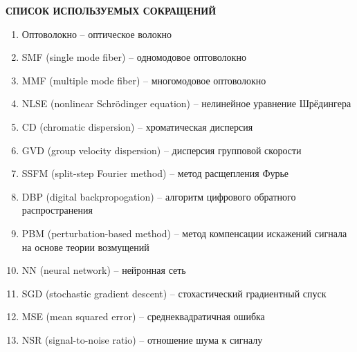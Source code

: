 \newpage
\begin{center}
	\textbf{СПИСОК ИСПОЛЬЗУЕМЫХ СОКРАЩЕНИЙ}
\end{center}
\begin{enumerate}
	\item Оптоволокно -- оптическое волокно
	\item SMF (single mode fiber) -- одномодовое оптоволокно
	\item MMF (multiple mode fiber) -- многомодовое оптоволокно
	\item NLSE (nonlinear Schrödinger equation) -- нелинейное уравнение Шрёдингера
	\item CD (chromatic dispersion) -- хроматическая дисперсия
	\item GVD (group velocity dispersion) -- дисперсия групповой скорости
	\item SSFM (split-step Fourier method) -- метод расщепления Фурье
	\item DBP (digital backpropogation) -- алгоритм цифрового обратного распространения
	\item PBM (perturbation-based method) -- метод компенсации искажений сигнала на основе теории возмущений
	\item NN (neural network) -- нейронная сеть
	\item SGD (stochastic gradient descent) -- стохастический градиентный спуск
	\item MSE (mean squared error) -- среднеквадратичная ошибка
	\item NSR (signal-to-noise ratio) -- отношение шума к сигналу
\end{enumerate}
\setcounter{page}{3}
